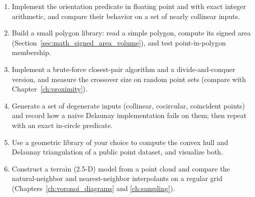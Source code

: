 \begin{enumerate}
  \item Implement the orientation predicate in floating point and with
    exact integer arithmetic, and compare their behavior on a set of
    nearly collinear inputs.
  \item Build a small polygon library: read a simple polygon, compute its
    signed area (Section~\ref{sec:math_signed_area_volume}), and test
    point-in-polygon membership.
  \item Implement a brute-force closest-pair algorithm and a
    divide-and-conquer version, and measure the crossover size on random
    point sets (compare with Chapter~\ref{ch:proximity}).
  \item Generate a set of degenerate inputs (collinear, cocircular,
    coincident points) and record how a naive Delaunay implementation
    fails on them; then repeat with an exact in-circle predicate.
  \item Use a geometric library of your choice to compute the convex hull
    and Delaunay triangulation of a public point dataset, and visualize
    both.
  \item Construct a terrain (2.5-D) model from a point cloud and compare
    the natural-neighbor and nearest-neighbor interpolants on a regular
    grid (Chapters~\ref{ch:voronoi_diagrams} and \ref{ch:sampling}).
\end{enumerate}
